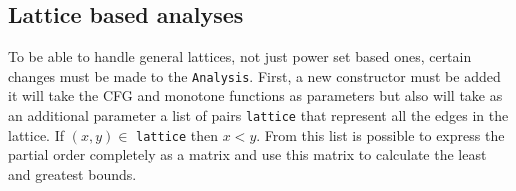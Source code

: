 \subsection{Lattice based analyses}
To be able to handle general lattices, not just power set based ones, certain changes must be made to the \lstinline{Analysis}. First, a new constructor must be added it will take the CFG and monotone functions as parameters but also will take as an additional parameter a list of pairs \lstinline{lattice} that represent all the edges in the lattice. If $(x,y) \in$ \lstinline{lattice} then $x < y$. From this list is possible to express the partial order completely as a matrix and use this matrix to calculate the least and greatest bounds. 


